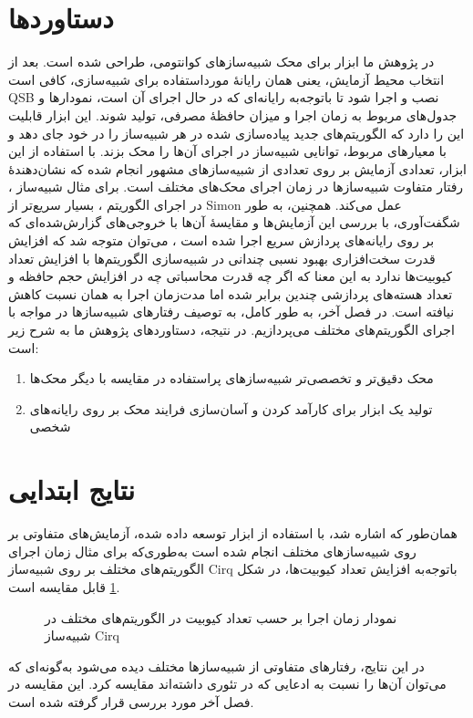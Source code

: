 \section{دستاوردها}
در پژوهش ما ابزار
برای محک شبیه‌سازهای کوانتومی، طراحی شده است. بعد از انتخاب محیط آزمایش، یعنی همان رایانهٔ مورداستفاده برای شبیه‌سازی، کافی است QSB نصب و اجرا شود تا باتوجه‌به رایانه‌ای که در حال اجرای آن است، نمودارها و جدول‌های مربوط به زمان اجرا و میزان حافظهٔ مصرفی، تولید شوند. این ابزار قابلیت این را دارد که الگوریتم‌های جدید پیاده‌سازی شده در هر شبیه‌ساز را در خود جای دهد و با معیارهای مربوط، توانایی شبیه‌ساز در اجرای آن‌ها را محک بزند. با استفاده از این ابزار، تعدادی آزمایش بر روی تعدادی از شبیه‌سازهای مشهور انجام شده که نشان‌دهندهٔ رفتار متفاوت شبیه‌سازها در زمان اجرای محک‌های مختلف است. برای مثال شبیه‌ساز
،
 در اجرای الگوریتم
،
بسیار سریع‌تر از Simon عمل می‌کند. همچنین، به طور شگفت‌آوری، با بررسی این آزمایش‌ها و مقایسهٔ آن‌ها با خروجی‌های گزارش‌شده‌ای که بر روی رایانه‌های پردازش سریع اجرا شده است
\cite{jamadagni_benchmarking_2024}،
می‌توان متوجه شد که افزایش قدرت سخت‌افزاری بهبود نسبی چندانی در شبیه‌سازی الگوریتم‌ها با افزایش تعداد کیوبیت‌ها ندارد به این معنا که اگر چه قدرت محاسباتی چه در افزایش حجم حافظه و تعداد هسته‌های پردازشی چندین برابر شده اما مدت‌زمان اجرا به همان نسبت کاهش نیافته است. در فصل آخر، به طور کامل، به توصیف رفتارهای شبیه‌سازها در مواجه با اجرای الگوریتم‌های مختلف می‌پردازیم. در نتیجه، دستاوردهای  پژوهش ما به شرح زیر است:
\begin{enumerate}[label=\arabic*{-}]
	\item محک دقیق‌تر و تخصصی‌تر شبیه‌سازهای پراستفاده در مقایسه با دیگر محک‌ها
	\item تولید یک ابزار برای کارآمد کردن و آسان‌سازی فرایند محک بر روی رایانه‌های شخصی
\end{enumerate}

\section{نتایج ابتدایی}
همان‌طور که اشاره شد، با استفاده از ابزار توسعه داده شده، آزمایش‌های متفاوتی بر روی شبیه‌سازهای مختلف انجام شده است به‌طوری‌که برای مثال زمان اجرای الگوریتم‌های مختلف بر روی شبیه‌ساز Cirq باتوجه‌به افزایش تعداد کیوبیت‌ها، در شکل
\ref{fig:1}
قابل مقایسه است.
\begin{figure}
	\centering
	\captionsetup{justification=centering,margin*=0.5cm}
	
	\caption{
	نمودار زمان اجرا بر حسب تعداد کیوبیت در الگوریتم‌های مختلف در شبیه‌ساز Cirq}
	\label{fig:1}
\end{figure}

در این نتایج، رفتارهای متفاوتی از شبیه‌سازها مختلف دیده می‌شود به‌گونه‌ای که می‌توان آن‌ها را نسبت به ادعایی که در تئوری داشته‌اند مقایسه کرد. این مقایسه در فصل آخر مورد بررسی قرار گرفته شده است.
